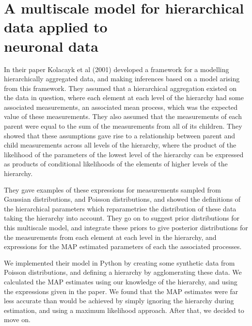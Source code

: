 \documentclass[a4paper,12pt]{article}
\theoremstyle{definition}
\begin{document}
\section{A multiscale model for hierarchical data applied to \\ neuronal data}
In their paper Kolacayk et al (2001) developed a framework for a modelling hierarchically aggregated data, and making inferences based on a model arising from this framework. They assumed that a hierarchical aggregation existed on the data in question, where each element at each level of the hierarchy had some associated measurements, an associated mean process, which was the expected value of these measurements. They also assumed that the measurements of each parent were equal to the sum of the measurements from all of its children. They showed that these assumptions gave rise to a relationship between parent and child measurements across all levels of the hierarchy, where the product of the likelihood of the parameters of the lowest level of the hierarchy can be expressed as products of conditional likelihoods of the elements of higher levels of the hierarchy\cite{kolacayk}.

They gave examples of these expressions for measurements sampled from Gaussian distributions, and Poisson distributions, and showed the definitions of the hierarchical parameters which reparametrise the distribution of these data taking the hierarchy into account. They go on to suggest prior distributions for this multiscale model, and integrate these priors to give posterior distributions for the measurements from each element at each level in the hierarchy, and expressions for the MAP estimated parameters of each the associated processes\cite{kolacayk}.

We implemented their model in Python by creating some synthetic data from Poisson distributions, and defining a hierarchy by agglomerating these data. We calculated the MAP estimates using our knowledge of the hierarchy, and using the expressions given in the paper. We found that the MAP estimates were far less accurate than would be achieved by simply ignoring the hierarchy during estimation, and using a maximum likelihood approach. After that, we decided to move on.


\end{document}
